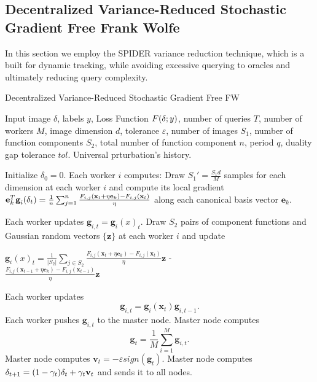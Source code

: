 \subsection{Decentralized Variance-Reduced Stochastic Gradient Free Frank Wolfe}
In this section we employ the SPIDER variance reduction technique, which is a built for dynamic tracking, while avoiding excessive querying to oracles and ultimately reducing query complexity.
\begin{algorithm}
	\caption{Decentralized Variance-Reduced Stochastic Gradient Free FW}\label{variance-reduced}
	\begin{algorithmic}[1]
		\Require Input image \boldmath$\delta$, labels $y$, Loss Function $F(\text{\boldmath}\delta;y)$, number of queries $T$, number of workers $M$, image dimension $d$, tolerance $\varepsilon$, number of images $S_1$, number of function components $S_2$, total number of function component $n$, period $q$, duality gap tolerance $tol$.
		\Ensure Universal prturbation's history.
		
		\State Initialize \boldmath$\delta_0 = \text{0}$.
		\State Each worker $i$ computes:
		\State Draw {\small$S_1' = \frac{S_1d}{M}$} samples for each dimension at each worker $i$ and compute its local gradient \newline
		{\small$ \textbf{e}_k^T\textbf{g}_i(\text{\boldmath} \delta_t) = \frac{1}{n}\sum_{j=1}^{n}\frac{F_{i,j}(\textbf{x}_t + \eta\textbf{e}_k) - F_{i,j}(\textbf{x}_t) }{\eta} $} along each canonical basis vector $\textbf{e}_k$.
		
		\State Each worker updates $\textbf{g}_{i,t} = \textbf{g}_i(x)_t$.
		\Else
		\State Draw $S_2$ pairs of component functions and Gaussian random vectors $\{\textbf{z}\}$ at each worker $i$ and update
		
		\parbox[b]{\linewidth}{$\textbf{g}_i(x)_t = \frac{1}{|S_2|} \sum_{j \in S_2}\frac{F_{i,j}(\textbf{x}_t + \eta\textbf{e}_k)- F_{i,j}(\textbf{x}_t) }{\eta} \textbf{z}$ -\\
			
			$\frac{F_{i,j}(\textbf{x}_{t-1} + \eta\textbf{e}_k) - F_{i,j}(\textbf{x}_{t-1}) }{\eta} \textbf{z}$}
				
		\State Each worker updates 
		\[\textbf{g}_{i,t} = \textbf{g}_i(\textbf{x}_t) \textbf{g}_{i,t-1}.\]
		\EndIf
		\State Each worker pushes $\textbf{g}_{i,t}$ to the master node.
		\State Master node computes 
		\[\textbf{g}_t = \frac{1}{M} \sum_{i=1}^{M} \textbf{g}_{i,t}.\]
		\State Master node computes $\textbf{v}_t = - \varepsilon sign(\textbf{g}_t)$.
		\State Master node computes \boldmath$\delta_{t+1} = (1-\gamma_t)\text{\boldmath}\delta_t + \gamma_t\textbf{v}_t$ and sends it to all nodes.
		\EndFor
	\end{algorithmic}
\end{algorithm}
